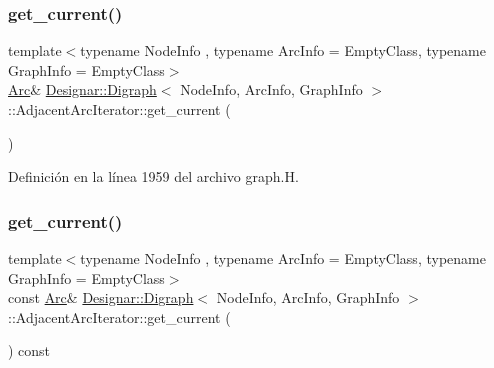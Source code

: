 \subsubsection{\texorpdfstring{get\+\_\+current()}{get\_current()}\hspace{0.1cm}{\footnotesize\ttfamily [1/2]}}
{\footnotesize\ttfamily template$<$typename Node\+Info , typename Arc\+Info  = Empty\+Class, typename Graph\+Info  = Empty\+Class$>$ \\
\hyperlink{class_designar_1_1_digraph_a0ceb278671f2a535c00fddccdeafd69f}{Arc}\& \hyperlink{class_designar_1_1_digraph}{Designar\+::\+Digraph}$<$ Node\+Info, Arc\+Info, Graph\+Info $>$\+::Adjacent\+Arc\+Iterator\+::get\+\_\+current (\begin{DoxyParamCaption}{ }\end{DoxyParamCaption})\hspace{0.3cm}{\ttfamily [inline]}}



Definición en la línea 1959 del archivo graph.\+H.

\mbox{\label{class_designar_1_1_digraph_1_1_adjacent_arc_iterator_ac388275a16db45fc754a193766c215ce}} 
\subsubsection{\texorpdfstring{get\+\_\+current()}{get\_current()}\hspace{0.1cm}{\footnotesize\ttfamily [2/2]}}
{\footnotesize\ttfamily template$<$typename Node\+Info , typename Arc\+Info  = Empty\+Class, typename Graph\+Info  = Empty\+Class$>$ \\
const \hyperlink{class_designar_1_1_digraph_a0ceb278671f2a535c00fddccdeafd69f}{Arc}\& \hyperlink{class_designar_1_1_digraph}{Designar\+::\+Digraph}$<$ Node\+Info, Arc\+Info, Graph\+Info $>$\+::Adjacent\+Arc\+Iterator\+::get\+\_\+current (\begin{DoxyParamCaption}{ }\end{DoxyParamCaption}) const\hspace{0.3cm}{\ttfamily [inline]}}



